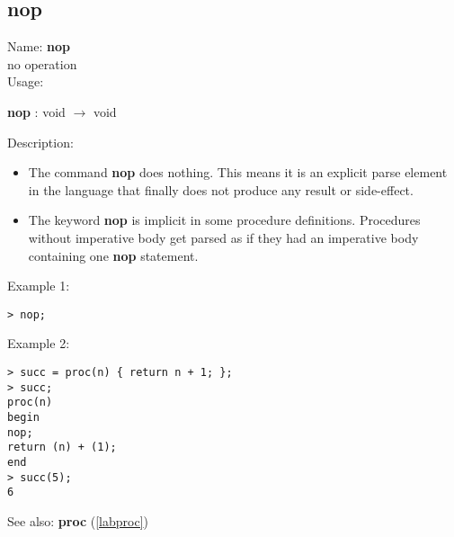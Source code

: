 \subsection{nop}
\label{labnop}
\noindent Name: \textbf{nop}\\
no operation\\

\noindent Usage: 
\begin{center}
\textbf{nop} : \textsf{void} $\rightarrow$ \textsf{void}\\
\end{center}
\noindent Description: \begin{itemize}

\item The command \textbf{nop} does nothing. This means it is an explicit parse
   element in the \sollya language that finally does not produce any
   result or side-effect.

\item The keyword \textbf{nop} is implicit in some procedure
   definitions. Procedures without imperative body get parsed as if they
   had an imperative body containing one \textbf{nop} statement.
\end{itemize}
\noindent Example 1: 
\begin{center}\begin{minipage}{15cm}\begin{Verbatim}[frame=single]
> nop;
\end{Verbatim}
\end{minipage}\end{center}
\noindent Example 2: 
\begin{center}\begin{minipage}{15cm}\begin{Verbatim}[frame=single]
> succ = proc(n) { return n + 1; };
> succ;
proc(n)
begin
nop;
return (n) + (1);
end
> succ(5);
6
\end{Verbatim}
\end{minipage}\end{center}
See also: \textbf{proc} (\ref{labproc})
